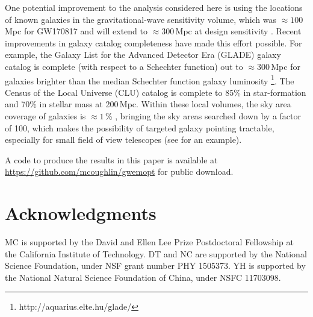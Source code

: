 \documentclass[twocolumn]{aastex61}
\begin{document}
One potential improvement to the analysis considered here is using the locations of known galaxies in the gravitational-wave sensitivity volume, which was $\approx 100$\,Mpc for GW170817 \citep{AbEA2017b} and will extend to $\approx 300$\,Mpc at design sensitivity \citep{aLIGO}. 
Recent improvements in galaxy catalog completeness have made this effort possible. For example, the Galaxy List for the Advanced Detector Era (GLADE) galaxy catalog is complete (with respect to a Schechter function) out to $\approx 300$\,Mpc for galaxies brighter than the median Schechter function galaxy luminosity \footnote{http://aquarius.elte.hu/glade/}. The Census of the Local Universe (CLU) catalog \citep{CoKa2017} is complete to 85\% in star-formation and 70\% in stellar mass at 200\,Mpc.
Within these local volumes, the sky area coverage of galaxies is $\approx 1$\,\% \cite{CoKa2017}, bringing the sky areas searched down by a factor of 100, which makes the possibility of targeted galaxy pointing tractable, especially for small field of view telescopes (see \cite{ArMc2017} for an example). 

A code to produce the results in this paper is available at 
\url{https://github.com/mcoughlin/gwemopt} for public download.

\section{Acknowledgments}
MC is supported by the David and Ellen Lee Prize Postdoctoral Fellowship at the California Institute of Technology. 
DT and NC are supported by the National Science Foundation, under NSF grant number PHY 1505373.
YH is supported by the National Natural Science Foundation of China, under NSFC 11703098.



\end{document}
